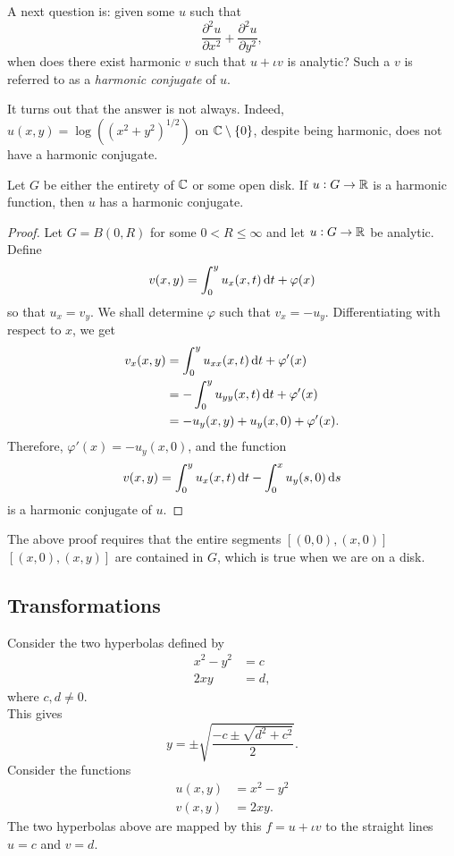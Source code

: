 	A next question is: given some $u$ such that
	\[ \frac{\partial^2 u}{\partial x^2} + \frac{\partial^2 u}{\partial y^2}, \]
	when does there exist harmonic $v$ such that $u + \iota v$ is analytic? Such a $v$ is referred to as a \emph{harmonic conjugate} of $u$.

	It turns out that the answer is not always. Indeed, $u(x,y) = \log((x^2+y^2)^{1/2})$ on $\mathbb{C}\setminus\{0\}$, despite being harmonic, does not have a harmonic conjugate.

	\begin{ftheo}
		\label{theo: open disk harmonic conjugate}
		Let $G$ be either the entirety of $\mathbb{C}$ or some open disk. If $u : G \to \mathbb{R}$ is a harmonic function, then $u$ has a harmonic conjugate.
	\end{ftheo}
	\begin{proof}
		Let $G = B(0,R)$ for some $0 < R \le \infty$ and let $u : G \to \mathbb{R}$ be analytic. Define
		\[ v(x,y) = \int_0^y u_x(x,t) \dif t + \varphi(x) \]
		so that $u_x = v_y$. We shall determine $\varphi$ such that $v_x = - u_y$. Differentiating with respect to $x$, we get
		\begin{align*}
			v_x(x,y) &= \int_0^y u_{xx}(x,t) \dif t + \varphi'(x) \\
				&= - \int_0^y u_{yy}(x,t) \dif t + \varphi'(x) \\
				&= - u_y(x,y) + u_y(x,0) + \varphi'(x).
		\end{align*}
		Therefore, $\varphi'(x) = - u_y(x,0)$, and the function
		\[ v(x,y) = \int_0^y u_x(x,t) \dif t - \int_0^x u_y(s,0) \dif s \]
		is a harmonic conjugate of $u$.
	\end{proof}

	The above proof requires that the entire segments $[(0,0),(x,0)]$ $[(x,0),(x,y)]$ are contained in $G$, which is true when we are on a disk.

\subsection{Transformations}

	Consider the two hyperbolas defined by
	\begin{align*}
		x^2-y^2 &= c \\
		2xy &= d,
	\end{align*}
	where $c,d \ne 0$.\\
	This gives
	\[ y = \pm \sqrt{ \frac{-c \pm \sqrt{d^2+c^2}}{2} }. \]
	Consider the functions
	\begin{align*}
		u(x,y) &= x^2 - y^2 \\
		v(x,y) &= 2xy.
	\end{align*}
	The two hyperbolas above are mapped by this $f = u + \iota v$ to the straight lines $u=c$ and $v=d$.\\

